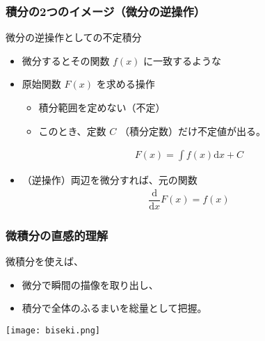 \documentclass[12pt, dvipdfmx]{beamer}
\begin{document}
\begin{frame}
	\frametitle{積分の2つのイメージ（微分の逆操作）}
		\begin{exampleblock}{微分の逆操作としての不定積分}
			\begin{itemize}
				\item 微分するとその関数 $f(x)$ に一致するような
				\item 原始関数 $F(x)$ を求める操作
				\begin{itemize}
					\item 積分範囲を定めない（不定）
					\item このとき、\alert{定数 $C$ （積分定数）だけ不定値}が出る。
				\end{itemize}
					\begin{align*}
						F(x) = \int f(x) \mathrm{d} x +C
					\end{align*}
				\item \alert{（逆操作）}両辺を微分すれば、元の関数
					\begin{align*}
						\dfrac{\mathrm{d}}{\mathrm{d} x} F(x) = f(x)
					\end{align*}
			\end{itemize}
		\end{exampleblock}
\end{frame}

\begin{frame}
	\frametitle{微積分の直感的理解}
	\begin{exampleblock}{微積分を使えば、}
		\begin{itemize}
			\item 微分で瞬間の描像を取り出し、
			\item 積分で全体のふるまいを総量として把握。
		\end{itemize}
	\end{exampleblock}
	\vspace{5mm}
	\texttt{[image: biseki.png]}
\end{frame}
\end{document}
